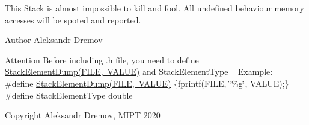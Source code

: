 This Stack is almost impossible to kill and fool. All undefined behaviour memory accesses will be spoted and reported. \begin{DoxyAuthor}{Author}
Aleksandr Dremov 
\end{DoxyAuthor}
\begin{DoxyAttention}{Attention}
Before including .h file, you need to define \mbox{\hyperlink{StackRigid_8h_a231d62549d9cfc45a003c319b7e1779e}{Stack\+Element\+Dump(\+F\+I\+L\+E, V\+A\+L\+U\+E)}} and Stack\+Element\+Type ~\newline
Example\+:~\newline
\#define \mbox{\hyperlink{StackRigid_8h_a231d62549d9cfc45a003c319b7e1779e}{Stack\+Element\+Dump(\+F\+I\+L\+E, V\+A\+L\+U\+E)}} \{fprintf(F\+I\+LE, \char`\"{}\%g\char`\"{}, V\+A\+L\+UE);\}~\newline
\#define Stack\+Element\+Type double~\newline

\end{DoxyAttention}
\begin{DoxyCopyright}{Copyright}
Aleksandr Dremov, M\+I\+PT 2020 
\end{DoxyCopyright}
